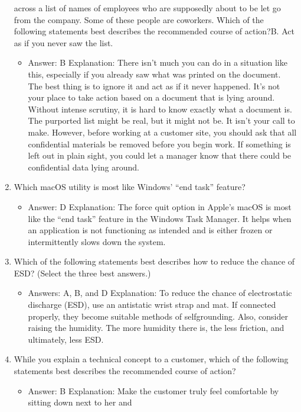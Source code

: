 \documentclass{article}
\begin{document}
\begin{enumerate}
across a list of names of employees who are supposedly about to
be let go from the company. Some of these people are coworkers.
Which of the following statements best describes the recommended
course of action?B. Act as if you never saw the list.
    \begin{itemize}
        \item Answer: B
Explanation: There isn’t much you can do in a situation like this, especially if you
already saw what was printed on the document. The best thing is to ignore it and act
as if it never happened. It’s not your place to take action based on a document that
is lying around. Without intense scrutiny, it is hard to know exactly what a document
is. The purported list might be real, but it might not be. It isn’t your call to make.
However, before working at a customer site, you should ask that all confidential materials
be removed before you begin work. If something is left out in plain sight, you could
let a manager know that there could be confidential data lying around.
    \end{itemize}
    \item Which macOS utility is most like Windows’ “end task” feature?
    \begin{itemize}
        \item Answer: D
Explanation: The force quit option in Apple’s macOS is most like the “end task” feature
in the Windows Task Manager. It helps when an application is not functioning as
intended and is either frozen or intermittently slows down the system.
    \end{itemize}
    \item Which of the following statements best describes how to reduce
the chance of ESD? (Select the three best answers.)
    \begin{itemize}
        \item Answers: A, B, and D
Explanation: To reduce the chance of electrostatic discharge (ESD), use an antistatic
wrist strap and mat. If connected properly, they become suitable methods of selfgrounding.
Also, consider raising the humidity. The more humidity there is, the less
friction, and ultimately, less ESD.
    \end{itemize}
    \item While you explain a technical concept to a customer, which of the
following statements best describes the recommended course of
action?
    \begin{itemize}
        \item Answer: B
Explanation: Make the customer truly feel comfortable by sitting down next to her and

\end{itemize}
\end{enumerate}
\end{document}
